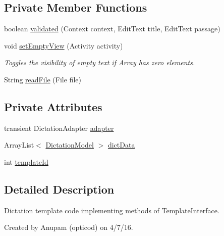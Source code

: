 \subsection*{Private Member Functions}
\begin{DoxyCompactItemize}
\item 
boolean \hyperlink{classorg_1_1buildmlearn_1_1toolkit_1_1templates_1_1DictationTemplate_aaa25f072cbb34597196cfec4cb4b9023}{validated} (Context context, Edit\+Text title, Edit\+Text passage)
\item 
void \hyperlink{classorg_1_1buildmlearn_1_1toolkit_1_1templates_1_1DictationTemplate_a90a6f21ae43150a1531f5ca88638d059}{set\+Empty\+View} (Activity activity)
\begin{DoxyCompactList}\small\item\em Toggles the visibility of empty text if Array has zero elements. \end{DoxyCompactList}\item 
String \hyperlink{classorg_1_1buildmlearn_1_1toolkit_1_1templates_1_1DictationTemplate_af43334fa0e341ee6bde918d39cda57da}{read\+File} (File file)
\end{DoxyCompactItemize}
\subsection*{Private Attributes}
\begin{DoxyCompactItemize}
\item 
transient Dictation\+Adapter \hyperlink{classorg_1_1buildmlearn_1_1toolkit_1_1templates_1_1DictationTemplate_aa96617a4a9b2a3b644f09014d3764081}{adapter}
\item 
Array\+List$<$ \hyperlink{classorg_1_1buildmlearn_1_1toolkit_1_1templates_1_1DictationModel}{Dictation\+Model} $>$ \hyperlink{classorg_1_1buildmlearn_1_1toolkit_1_1templates_1_1DictationTemplate_a95030ad007d0a8047accfdd29b62588b}{dict\+Data}
\item 
int \hyperlink{classorg_1_1buildmlearn_1_1toolkit_1_1templates_1_1DictationTemplate_a4ad8d52a9cf5c27a33391d252a0fae02}{template\+Id}
\end{DoxyCompactItemize}


\subsection{Detailed Description}
Dictation template code implementing methods of Template\+Interface. 

Created by Anupam (opticod) on 4/7/16. 


